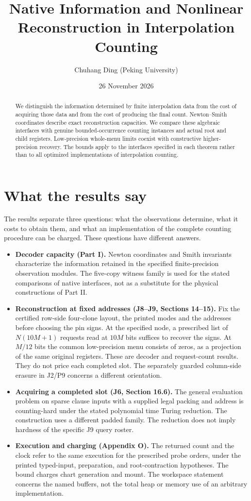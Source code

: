 \documentclass[11pt,a4paper]{article}
\title{Native Information and Nonlinear Reconstruction in Interpolation Counting\SubtitleForOfflineBuild{Exact Decoder Capacities, Native Interfaces, and Escape Mechanisms}}
\author{Chuhang Ding (Peking University)}
\date{26 November 2026}
\begin{document}
\maketitle
\begin{abstract}
We distinguish the information determined by finite interpolation data from
the cost of acquiring those data and from the cost of producing the final
count. Newton--Smith coordinates describe exact reconstruction capacities.
We compare these algebraic interfaces with genuine bounded-occurrence
counting instances and actual root and child registers. Low-precision
whole-menu limits coexist with constructive higher-precision recovery.
The bounds apply to the interfaces specified in each theorem rather than
to all optimized implementations of interpolation counting.
\end{abstract}


\section*{What the results say}
The results separate three questions: what the observations determine,
what it costs to obtain them, and what an implementation of the complete
counting procedure can be charged. These questions have different answers.

\begin{itemize}
\item \textbf{Decoder capacity (Part I).}
  Newton coordinates and Smith invariants characterize the information
  retained in the specified finite-precision observation modules. The
  five-copy witness family is used for the stated comparisons of native
  interfaces, not as a substitute for the physical constructions of Part II.
\item \textbf{Reconstruction at fixed addresses (J8--J9, Sections 14--15).}
  Fix the certified row-side four-clone layout, the printed modes and the
  addresses before choosing the pin signs. At the specified node, a
  prescribed list of \(N(10M+1)\) requests read at \(10M\) bits suffices to
  recover the signs. At \(M/12\) bits the common low-precision menu consists
  of zeros, as a projection of the same original registers. These are
  decoder and request-count results. They do not price each completed
  slot. The separately guarded column-side erasure in J2/P9 concerns a
  different orientation.
\item \textbf{Acquiring a completed slot (J6, Section 16.6).}
  The general evaluation problem on sparse clause inputs with a supplied
  legal packing and address is counting-hard under the stated polynomial
  time Turing reduction. The construction uses a different padded family.
  The reduction does not imply hardness of the specific J9 query roster.
\item \textbf{Execution and charging (Appendix O).}
  The returned count and the clock refer to the same execution for the
  prescribed probe orders, under the printed typed-input, preparation,
  and root-contraction hypotheses. The bound charges chart generation and
  mount. The workspace statement concerns the named buffers, not the
  total heap or memory use of an arbitrary implementation.
\end{itemize}
\end{document}
